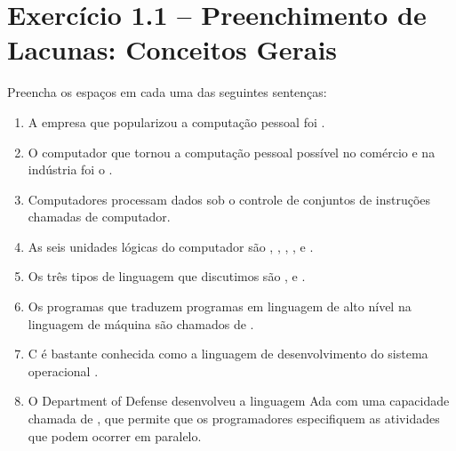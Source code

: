 \documentclass[12pt,a4paper]{article}
\begin{document}
\section{Exercício 1.1 -- Preenchimento de Lacunas: Conceitos Gerais}

\begin{enunciadoBox}[Enunciado]
Preencha os espaços em cada uma das seguintes sentenças:
\begin{enumerate}[label=\textbf{\alph*)}]
  \item A empresa que popularizou a computação pessoal foi \underline{\hspace{3cm}}.
  \item O computador que tornou a computação pessoal possível no comércio e na indústria foi o \underline{\hspace{3cm}}.
  \item Computadores processam dados sob o controle de conjuntos de instruções chamadas \underline{\hspace{3cm}} de computador.
  \item As seis unidades lógicas do computador são \underline{\hspace{2cm}}, \underline{\hspace{2cm}}, \underline{\hspace{2cm}}, \underline{\hspace{2cm}}, \underline{\hspace{2cm}} e \underline{\hspace{2cm}}.
  \item Os três tipos de linguagem que discutimos são \underline{\hspace{2cm}}, \underline{\hspace{2cm}} e \underline{\hspace{2cm}}.
  \item Os programas que traduzem programas em linguagem de alto nível na linguagem de máquina são chamados de \underline{\hspace{3cm}}.
  \item C é bastante conhecida como a linguagem de desenvolvimento do sistema operacional \underline{\hspace{3cm}}.
  \item O Department of Defense desenvolveu a linguagem Ada com uma capacidade chamada de \underline{\hspace{3cm}}, que permite que os programadores especifiquem as atividades que podem ocorrer em paralelo.
\end{enumerate}
\end{enunciadoBox}
\end{document}
